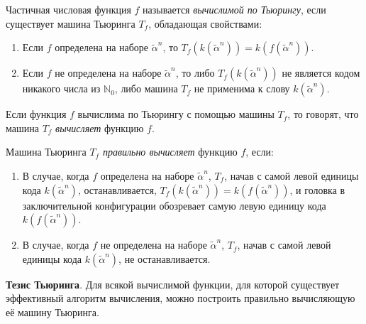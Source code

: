 \begin{definition*}
    Частичная числовая функция $f$ называется \textit{вычислимой по Тьюрингу}, если существует машина Тьюринга $T_f$, обладающая свойствами:
    \begin{enumerate}
        \item Если $f$ определена на наборе $\widetilde\alpha^n$, то $T_f\left(k\left(\widetilde\alpha^n\right)\right) = k\left(f\left(\widetilde\alpha^n\right)\right)$.
        \item Если $f$ не определена на наборе $\widetilde\alpha^n$, то либо $T_f\left(k\left(\widetilde\alpha^n\right)\right)$ не является кодом никакого числа из $\mathbb{N}_0$, либо машина $T_f$ не применима к слову $k\left(\widetilde\alpha^n\right)$.
    \end{enumerate}
    Если функция $f$ вычислима по Тьюрингу с помощью машины $T_f$, то говорят, что машина $T_f$ \textit{вычисляет} функцию $f$.
\end{definition*}

\begin{definition*}
    Машина Тьюринга $T_f$ \textit{правильно вычисляет} функцию $f$, если:
    \begin{enumerate}
        \item В случае, когда $f$ определена на наборе $\widetilde\alpha^n$, $T_f$, начав с самой левой единицы кода $k\left(\widetilde\alpha^n\right)$, останавливается, $T_f\left(k\left(\widetilde\alpha^n\right)\right) = k\left(f\left(\widetilde\alpha^n\right)\right)$, и головка в заключительной конфигурации обозревает самую левую единицу кода $k\left(f\left(\widetilde\alpha^n\right)\right)$.
        \item В случае, когда $f$ не определена на наборе $\widetilde\alpha^n$, $T_f$, начав с самой левой единицы кода $k\left(\widetilde\alpha^n\right)$, не останавливается.
    \end{enumerate}
\end{definition*}

\textbf{Тезис Тьюринга}. Для всякой вычислимой функции, для которой существует эффективный алгоритм вычисления, можно построить правильно вычисляющую её машину Тьюринга. 